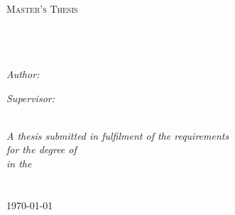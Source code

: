 \documentclass[11pt, a4paper, oneside]{Thesis} %
\begin{document}
\begin{titlepage}
\begin{center}

\textsc{\LARGE \univname}\\[1.5cm] %
\textsc{\Large Master's Thesis}\\[0.5cm] %

\HRule \\[0.4cm] %
{\huge \bfseries \ttitle}\\[0.4cm] %
\HRule \\[1.5cm] %
 
\begin{minipage}{0.4\textwidth}
\begin{flushleft} \large
\emph{Author:}\\
\href{http://www.johnsmith.com}{\authornames} %
\end{flushleft}
\end{minipage}
\begin{minipage}{0.4\textwidth}
\begin{flushright} \large
\emph{Supervisor:} \\
\href{http://www.jamessmith.com}{\supname} %
\end{flushright}
\end{minipage}\\[3cm]
 
\large \textit{A thesis submitted in fulfilment of the requirements\\ for the degree of \degreename}\\[0.3cm] %
\textit{in the}\\[0.4cm]
\groupname\\\deptname\\[2cm] %
 
{\large \today}\\[4cm] %
 
\vfill
\end{center}

\end{titlepage}

\end{document}
